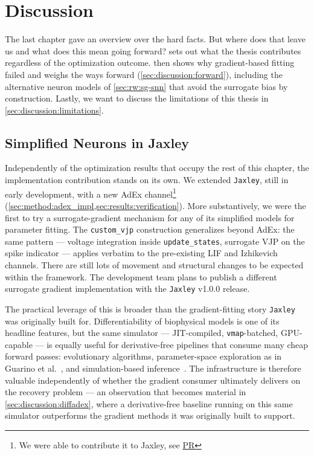 \chapter{Discussion}\label{ch:discussion}

The last chapter gave an overview over the hard facts.
But where does that leave us and what does this mean going forward?
 sets out what the thesis contributes regardless of the optimization outcome.
 then shows why gradient-based fitting failed and weighs the ways forward (\cref{sec:discussion:forward}), including the alternative neuron models of \cref{sec:rw:sg-snn} that avoid the surrogate bias by construction.
Lastly, we want to discuss the limitations of this thesis in \cref{sec:discussion:limitations}.

\section{Simplified Neurons in Jaxley}\label{sec:discussion:jaxley}

Independently of the optimization results that occupy the rest of this chapter, the implementation contribution stands on its own.
We extended \texttt{Jaxley}, still in early development, with a new \gls{AdEx} channel\footnote{We were able to contribute it to Jaxley, see \href{https://github.com/jaxleyverse/jaxley/pull/780}{PR}} (\cref{sec:method:adex_impl,sec:results:verification}).
More substantively, we were the first to try a surrogate-gradient mechanism for any of its simplified models for parameter fitting.
The \texttt{custom\_vjp} construction generalizes beyond \gls{AdEx}: the same pattern --- voltage integration inside \texttt{update\_states}, surrogate \gls{VJP} on the spike indicator --- applies verbatim to the pre-existing \gls{LIF} and Izhikevich channels.
There are still lots of movement and structural changes to be expected within the framework.
The development team plans to publish a different surrogate gradient implementation with the \texttt{Jaxley} v1.0.0 release.

The practical leverage of this is broader than the gradient-fitting story \texttt{Jaxley} was originally built for.
Differentiability of biophysical models is one of its headline features, but the same simulator --- \gls{JIT}-compiled, \texttt{vmap}-batched, GPU-capable --- is equally useful for derivative-free pipelines that consume many cheap forward passes: evolutionary algorithms, parameter-space exploration as in Guarino et al.~\cite{Guarino2025}, and simulation-based inference~\cite{Goncalves2020}.
The infrastructure is therefore valuable independently of whether the gradient consumer ultimately delivers on the recovery problem --- an observation that becomes material in \cref{sec:discussion:diffadex}, where a derivative-free baseline running on this same simulator outperforms the gradient methods it was originally built to support.


